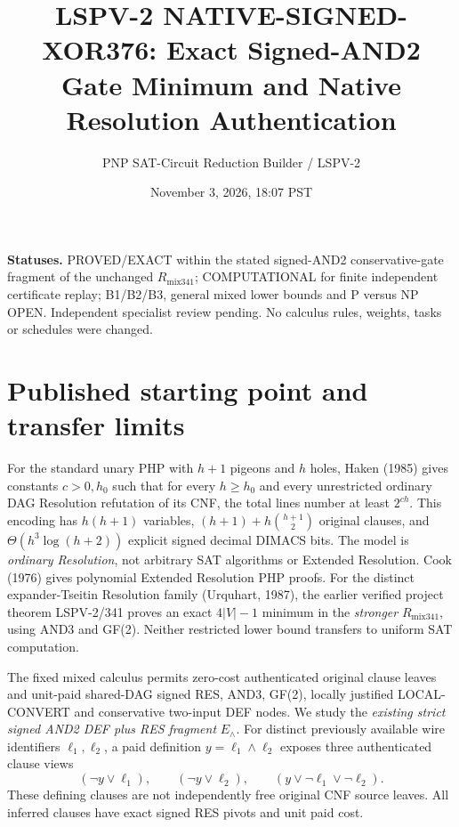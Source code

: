 \documentclass[11pt]{article}
\title{LSPV-2 NATIVE-SIGNED-XOR376: Exact Signed-AND2 Gate Minimum and Native Resolution Authentication}
\author{PNP SAT-Circuit Reduction Builder / LSPV-2}
\date{November 3, 2026, 18:07 PST}
\begin{document}
\maketitle
\noindent\textbf{Statuses.} PROVED/EXACT within the stated signed-AND2 conservative-gate fragment of the unchanged \(R_{\mathrm{mix341}}\); COMPUTATIONAL for finite independent certificate replay; B1/B2/B3, general mixed lower bounds and P versus NP OPEN. Independent specialist review pending. No calculus rules, weights, tasks or schedules were changed.

\section*{Published starting point and transfer limits}
For the standard unary PHP with \(h+1\) pigeons and \(h\) holes, Haken (1985) gives constants \(c>0,h_0\) such that for every \(h\ge h_0\) and every unrestricted ordinary DAG Resolution refutation of its CNF, the total lines number at least \(2^{ch}\). This encoding has \(h(h+1)\) variables, \((h+1)+h\binom{h+1}{2}\) original clauses, and \(\Theta(h^3\log(h+2))\) explicit signed decimal DIMACS bits. The model is \emph{ordinary Resolution}, not arbitrary SAT algorithms or Extended Resolution. Cook (1976) gives polynomial Extended Resolution PHP proofs. For the distinct expander-Tseitin Resolution family (Urquhart, 1987), the earlier verified project theorem LSPV-2/341 proves an exact \(4|V|-1\) minimum in the \emph{stronger} \(R_{\mathrm{mix341}}\), using AND3 and GF(2). Neither restricted lower bound transfers to uniform SAT computation.

The fixed mixed calculus permits zero-cost authenticated original clause leaves and unit-paid shared-DAG signed RES, AND3, GF(2), locally justified LOCAL-CONVERT and conservative two-input DEF nodes. We study the \emph{existing strict signed AND2 DEF plus RES fragment} \(E_{\wedge}\). For distinct previously available wire identifiers \(\ell_1,\ell_2\), a paid definition \(y=\ell_1\land\ell_2\) exposes three authenticated clause views
\[
(\neg y\vee\ell_1),\qquad(\neg y\vee\ell_2),\qquad(y\vee\neg\ell_1\vee\neg\ell_2).
\]
These defining clauses are not independently free original CNF source leaves. All inferred clauses have exact signed RES pivots and unit paid cost.
\end{document}
